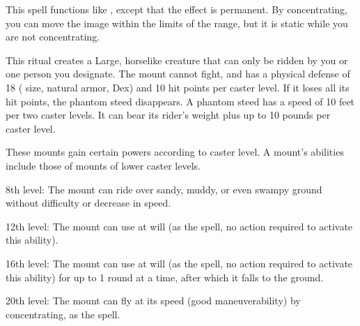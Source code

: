 \spelleffect This spell functions like , except that the effect is permanent. By concentrating, you can move the image within the limits of the range, but it is static while you are not concentrating.

\spelldur{\durext \dismissable}
\spelleffect This ritual creates a Large, horselike creature that can only be ridden by you or one person you designate. The mount cannot fight, and has a physical defense of 18 ( size,  natural armor,  Dex) and 10 hit points  per caster level. If it loses all its hit points, the phantom steed disappears. A phantom steed has a speed of 10 feet per two caster levels. It can bear its rider's weight plus up to 10 pounds per caster level.
\par These mounts gain certain powers according to caster level. A mount's abilities include those of mounts of lower caster levels. 
\par 8th level: The mount can ride over sandy, muddy, or even swampy ground without difficulty or decrease in speed.

\par 12th level: The mount can use  at will (as the spell, no action required to activate this ability).

\par 16th level: The mount can use  at will (as the spell, no action required to activate this ability) for up to 1 round at a time, after which it falls to the ground.

\par 20th level: The mount can fly at its speed (good maneuverability) by concentrating, as the  spell.

